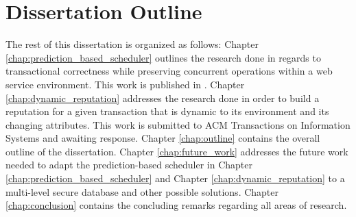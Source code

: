 \section{Dissertation Outline}
The rest of this dissertation is organized as follows: Chapter \ref{chap:prediction_based_scheduler} outlines the research done in regards to transactional correctness while preserving concurrent operations within a web service environment. This work is published in \cite{ravan_ensuring_2020}. Chapter \ref{chap:dynamic_reputation} addresses the research done in order to build a reputation for a given transaction that is dynamic to its environment and its changing attributes. This work is submitted to ACM Transactions on Information Systems and awaiting response. Chapter \ref{chap:outline} contains the overall outline of the dissertation. Chapter \ref{chap:future_work} addresses the future work needed to adapt the prediction-based scheduler in Chapter \ref{chap:prediction_based_scheduler} and Chapter \ref{chap:dynamic_reputation} to a multi-level secure database and other possible solutions. Chapter \ref{chap:conclusion} contains the concluding remarks regarding all areas of research.